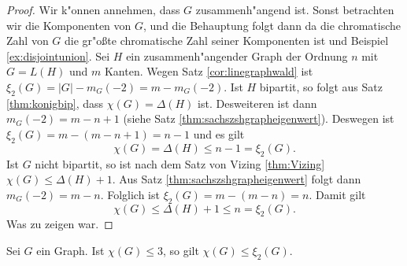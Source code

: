 \begin{proof}
  Wir k"onnen annehmen, dass $G$ zusammenh"angend ist. Sonst betrachten wir die Komponenten von $G$, und die Behauptung folgt dann da die chromatische Zahl von $G$ die gr"o{\ss}te chromatische Zahl seiner Komponenten ist und Beispiel \ref{ex:disjointunion}. 
  Sei $H$ ein zusammenh"angender Graph der Ordnung $n$ mit $G=L(H)$ und $m$ Kanten. 
  Wegen Satz \ref{cor:linegraphwald} ist $\xi_{2}(G) = |G| - m_G(-2) = m - m_G(-2)$. Ist $H$ bipartit, so folgt aus Satz \ref{thm:konigbip}, dass $\chi(G) = \Delta(H)$ ist.  
  Desweiteren ist dann $m_G(-2) = m-n+1$ (siehe Satz \ref{thm:sachszshgrapheigenwert}). Deswegen ist $\xi_{2}(G) = m - (m-n+1) = n-1$ und es gilt
  $$\chi(G) = \Delta(H) \leq n-1  = \xi_{2}(G).$$
  Ist $G$ nicht bipartit, so ist nach dem Satz von Vizing \ref{thm:Vizing} $\chi(G) \leq \Delta(H) +1$. Aus Satz \ref{thm:sachszshgrapheigenwert} folgt dann $m_G(-2) = m-n$. Folglich ist $\xi_{2}(G) = m - (m-n) = n$. Damit gilt
  $$\chi(G) \leq \Delta(H) +1 \leq n = \xi_{2}(G).$$
  Was zu zeigen war.
\end{proof}
\begin{theorem}
  Sei $G$ ein Graph. Ist $\chi(G) \leq 3$, so gilt $\chi(G) \leq \xi_{2}(G)$.
  \label{thm:chiklein}
\end{theorem}

